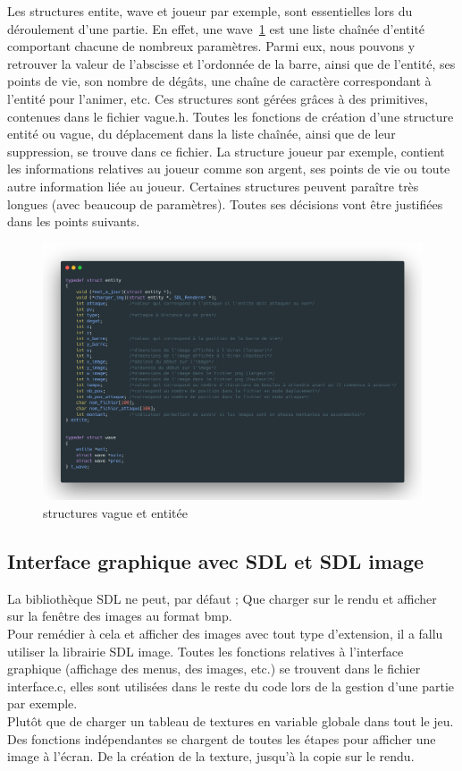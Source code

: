 \documentclass[a4paper,11pt]{article}
\begin{document}
Les structures entite, wave et joueur par exemple, sont essentielles lors du déroulement d'une partie. En effet, une wave~\ref{image5} est une liste chaînée d'entité comportant chacune de nombreux paramètres. Parmi eux, nous pouvons y retrouver la valeur de l'abscisse et l'ordonnée de la barre, ainsi que de l'entité, ses points de vie, son nombre de dégâts, une chaîne de caractère correspondant à l'entité pour l'animer, etc. Ces structures sont gérées grâces à des primitives, contenues dans le fichier vague.h. Toutes les fonctions de création d'une structure entité ou vague, du déplacement dans la liste chaînée, ainsi que de leur suppression, se trouve dans ce fichier. La structure joueur par exemple, contient les informations relatives au joueur comme son argent, ses points de vie ou toute autre information liée au joueur. Certaines structures peuvent paraître très longues (avec beaucoup de paramètres). Toutes ses décisions vont être justifiées dans les points suivants.

\begin{figure}[ht!]
    \centering
    \includegraphics [width=1\textwidth]{wave.png} 
    \caption {\label{image5} structures vague et entitée}
    \end{figure}
     \smallbreak

\subsection{Interface graphique avec SDL et SDL image}
La bibliothèque SDL ne peut, par défaut ; Que charger sur le rendu et afficher sur la fenêtre des images au format bmp.\\ Pour remédier à cela et afficher des images avec tout type d'extension, il a fallu utiliser la librairie SDL image. Toutes les fonctions relatives à l'interface graphique (affichage des menus, des images, etc.) se trouvent dans le fichier interface.c, elles sont utilisées dans le reste du code lors de la gestion d'une partie par exemple.\\ Plutôt que de charger un tableau de textures en variable globale dans tout le jeu. Des fonctions indépendantes se chargent de toutes les étapes pour afficher une image à l'écran. De la création de la texture, jusqu'à la copie sur le rendu.
\end{document}
